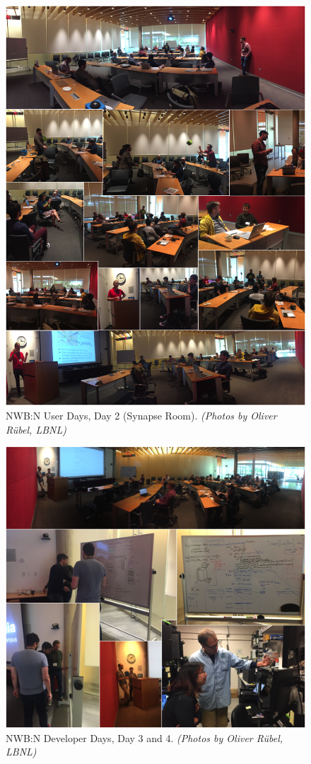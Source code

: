 \documentclass{article}
\begin{document}
\clearpage
\begin{figure}[h!]
\includegraphics[width=\textwidth]{figures/photos_day2_main_room.png}
\caption{NWB:N User Days, Day 2  (Synapse Room). \textit{(Photos by Oliver R\"ubel, LBNL)}}
\end{figure}

\clearpage
\begin{figure}[h!]
\includegraphics[width=\textwidth]{figures/photos_day3_4_developer_days.png}
\caption{NWB:N Developer Days, Day 3 and 4. \textit{(Photos by Oliver R\"ubel, LBNL)}}
\end{figure}
\end{document}
